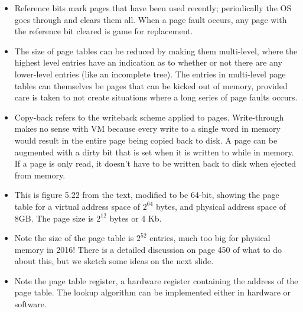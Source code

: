 \begin{frame}[fragile]
\BNotes\ifnum{}
\begin{itemize}
\item
Reference bits mark pages that have been used recently; periodically
the OS goes through and clears them all. When a page fault occurs, any
page with the reference bit cleared is game for replacement.
\item 
The size of page tables can be reduced by making them multi-level,
where the highest level entries have an indication as to whether or
not there are any lower-level entries (like an incomplete tree). The
entries in multi-level page tables can themselves be pages that can be
kicked out of memory, provided care is taken to not create situations
where a long series of page faults occurs. 
\item
Copy-back refers to the writeback scheme applied to
pages. Write-through makes no sense with VM because every write to a
single word in memory would result in the entire page being copied
back to disk. A page can be augmented with a
dirty bit that is set when it is written to while in memory. If a page
is only read, it doesn't have to be written back to disk when ejected
from memory.

\end{itemize}
\fi\ENotes
\end{frame}

\newpage
\begin{frame}[fragile]
\BNotes\ifnum{}
\begin{itemize}
\item
This is figure 5.22 from the text, modified to be 64-bit, showing the page table for a
virtual address space of $2^{64}$ bytes, and physical
address space of 8GB. The page size is $2^{12}$ bytes or
4 Kb. 
\item
Note the size of the page table is $2^{52}$ entries, much too big for 
physical memory in 2016!  There
is a detailed discussion on page 450 of what to do about this, but we
sketch some ideas on the next slide.
\item
Note the page table register, a hardware register containing the
address of the page table. The lookup algorithm can be implemented
either in hardware or software.
\end{itemize}
\fi\ENotes
\end{frame}

